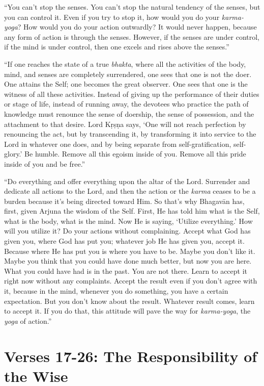 \documentclass[12pt, twoside, openright]{memoir}
\begin{document}
\enquote{You can’t stop the senses. You can’t stop the natural tendency of the senses, but you can control it. Even if you try to stop it, how would you do your \textit{karma-yoga}? How would you do your action outwardly? It would never happen, because any form of action is through the senses. However, if the senses are under control, if the mind is under control, then one excels and rises above the senses.}

\enquote{If one reaches the state of a true \textit{bhakta}, where all the activities of the body, mind, and senses are completely surrendered, one sees that one is not the doer. One attains the Self; one becomes the great observer. One sees that one is the witness of all these activities. Instead of giving up the performance of their duties or stage of life, instead of running away, the devotees who practice the path of knowledge must renounce the sense of doership, the sense of possession, and the attachment to that desire. Lord Kṛṣṇa says, \enquote{One will not reach perfection by renouncing the act, but by transcending it, by transforming it into service to the Lord in whatever one does, and by being separate from self-gratification, self-glory.} Be humble. Remove all this egoism inside of you. Remove all this pride inside of you and be free.}

\enquote{Do everything and offer everything upon the altar of the Lord. Surrender and dedicate all actions to the Lord, and then the action or the \textit{karma} ceases to be a burden because it’s being directed toward Him. So that’s why Bhagavān has, first, given Arjuna the wisdom of the Self. First, He has told him what is the Self, what is the body, what is the mind. Now He is saying, \enquote{Utilize everything.} How will you utilize it? Do your actions without complaining. Accept what God has given you, where God has put you; whatever job He has given you, accept it. Because where He has put you is where you have to be. Maybe you don’t like it. Maybe you think that you could have done much better, but now you are here. What you could have had is in the past. You are not there. Learn to accept it right now without any complaints. Accept the result even if you don’t agree with it, because in the mind, whenever you do something, you have a certain expectation. But you don’t know about the result. Whatever result comes, learn to accept it. If you do that, this attitude will pave the way for \textit{karma-yoga}, the \textit{yoga} of action.}

\section{Verses 17-26: The Responsibility of the Wise}\label{sec-verses-17-26-the-responsibility-of-the-wise}
\end{document}
